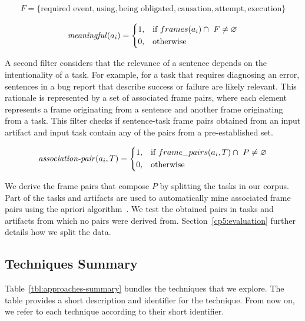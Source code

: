 \begin{equation}
\begin{split}
F = \{ \text{required event}, \text{using}, \text{being obligated}, \text{causation}, \text{attempt}, \text{execution} \} 
\end{split}
\end{equation}





\begin{equation}
\text{\textit{meaningful}}(a_i) = \left \{
\begin{aligned}
    &1, && \text{if}\ frames(a_i) \cap ~F \ne \emptyset \\
    &0, && \text{otherwise}
\end{aligned} \right.
\end{equation} 


\medskip
A second filter considers that the relevance of a sentence depends on the intentionality of a task. 
For example, for a task that requires diagnosing an error, sentences in a bug report that describe success or failure are likely relevant. 
This rationale is represented by a set of associated frame pairs, where each element represents a frame originating from a sentence and another frame originating from a task.
This filter checks if sentence-task frame pairs obtained from an input artifact and input task contain any of the pairs from a pre-established set.




\begin{equation}
\text{\textit{association-pair}}(a_i, T) = \left \{
\begin{aligned}
    &1, && \text{if}\ frame\_pairs(a_i, T) \cap ~P \ne \emptyset \\
    &0, && \text{otherwise}
\end{aligned} \right.
\end{equation} 

\smallskip
We derive the frame pairs that compose $P$ by splitting the tasks in our corpus. Part of the tasks and artifacts are used to automatically
mine associated frame pairs using the apriori algorithm~\cite{agrawal1994apriori}. We test the obtained pairs in tasks and artifacts from which no pairs were derived from. 
Section~\ref{cp5:evaluation} further details how we split the data.








\subsection{Techniques Summary}


Table~\ref{tbl:approaches-summary} bundles the techniques that we explore.
The table provides a short description and identifier for the technique. From now on, we refer to each technique according to their short identifier.


